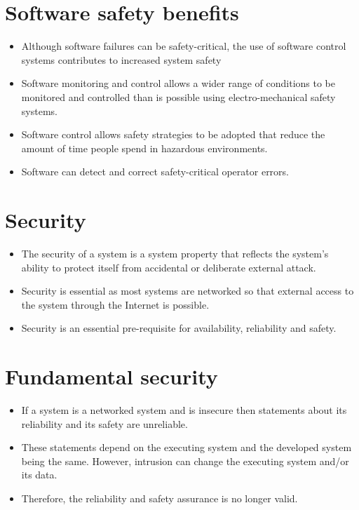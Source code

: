 \section{Software safety benefits}
\begin{itemize}
\item Although software failures can be safety-critical, the use of software control systems contributes to increased system safety

  \item Software monitoring and control allows a wider range of conditions to be monitored and controlled than is possible using electro-mechanical safety systems.
  \item Software control allows safety strategies to be adopted that reduce the amount of time people spend in hazardous environments.
  \item Software can detect and correct safety-critical operator errors.

\end{itemize}
\section{Security}
\begin{itemize}
\item The security of a system is a system property that reflects the system’s ability to protect itself from accidental or deliberate external attack.

\item Security is essential as most systems are networked so that external access to the system through the Internet is possible.

\item Security is an essential pre-requisite for availability, reliability and safety.


\end{itemize}
\section{Fundamental security}
\begin{itemize}
\item If a system is a networked system and is insecure then statements about its reliability and its safety are unreliable.

\item These statements depend on the executing system and the developed system being the same. However, intrusion can change the executing system and/or its data.

\item Therefore, the reliability and safety assurance is no longer valid.

\end{itemize}
\newpage
